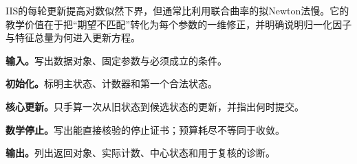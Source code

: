 IIS的每轮更新提高对数似然下界，但通常比利用联合曲率的拟Newton法慢。它的教学价值在于把“期望不匹配”转化为每个参数的一维修正，并明确说明归一化因子与特征总量为何进入更新方程。


\begin{keypointbox}[title={改进的迭代尺度法（IIS）：五步阅读}]
\textbf{输入。}写出数据对象、固定参数与必须成立的条件。\par
\textbf{初始化。}标明主状态、计数器和第一个合法状态。\par
\textbf{核心更新。}只手算一次从旧状态到候选状态的更新，并指出何时提交。\par
\textbf{数学停止。}写出能直接核验的停止证书；预算耗尽不等同于收敛。\par
\textbf{输出。}列出返回对象、实际计数、中心状态和用于复核的诊断。
\end{keypointbox}

